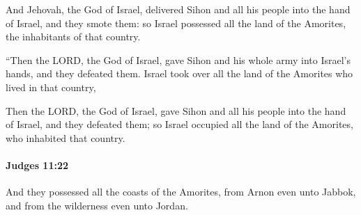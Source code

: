 			\begin{versebox}
					\item[BHS] 
					\item[ASV] And Jehovah, the God of Israel, delivered Sihon and all his people into the hand of Israel, and they smote them: so Israel possessed all the land of the Amorites, the inhabitants of that country.
					\item[NIV] “Then the LORD, the God of Israel, gave Sihon and his whole army into Israel’s hands, and they defeated them. Israel took over all the land of the Amorites who lived in that country,
					\item[NRSV] Then the LORD, the God of Israel, gave Sihon and all his people into the hand of Israel, and they defeated them; so Israel occupied all the land of the Amorites, who inhabited that country.
			\end{versebox}

		\paragraph{Judges 11:22} %
			\label{JUDGES-11-22}

			And they possessed all the coasts of the Amorites, from Arnon even unto Jabbok, and from the wilderness even unto Jordan.

